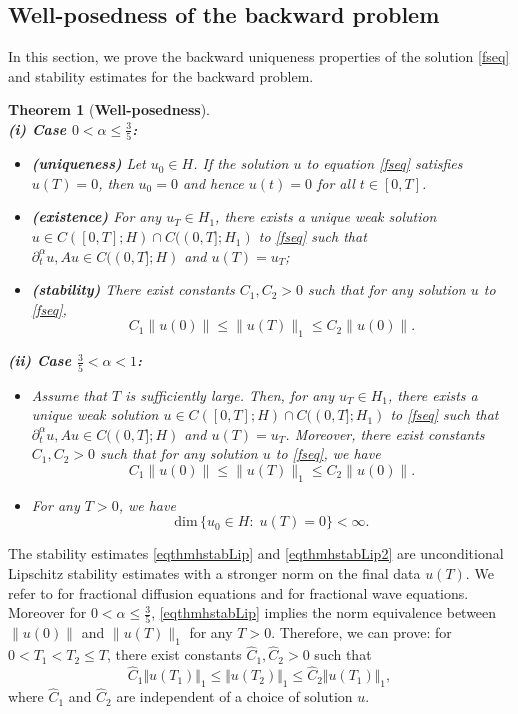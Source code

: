 \documentclass[reqno]{amsart}
\newtheorem{theorem}{Theorem}[section]
\numberwithin{equation}{section}
\begin{document}
\subsection{Well-posedness of the backward problem}
In this section, we prove the backward uniqueness properties of the solution \eqref{fseq} and stability estimates for the backward problem.
\begin{theorem}[\textbf{Well-posedness}]\label{bu}\
\\{\bf (i) Case $0<\alpha \le \frac{3}{5}$:}
\begin{itemize}
    \item[\bf (a)] {\bf (uniqueness)}
Let $u_0 \in H$. If the solution $u$ to equation \eqref{fseq} 
satisfies $u(T) = 0$, then $u_0 = 0$ and hence $u(t) = 0$ for all 
$t \in [0, T]$.
\item[\bf (b)] {\bf (existence)} 
For any $u_T \in H_1$, there exists a unique weak solution $u \in C([0, T]; H)\cap 
C((0, T] ; H_1)$ to \eqref{fseq} such that $\partial_t^\alpha u, Au 
\in C((0, T] ; H)$ and $u(T)=u_T$;
\item[\bf (c)] {\bf (stability)}
There exist constants $C_1, C_2 >0$ such that for any solution $u$ to 
\eqref{fseq},
\begin{equation}\label{eqthmhstabLip}
C_1\|u(0)\| \le \|u(T)\|_{1} \le C_2 \|u(0)\|.
\end{equation}
\end{itemize}
{\bf (ii) Case $\frac{3}{5} < \alpha < 1$:}
\begin{itemize}
\item[\bf (a)] Assume that $T$ is sufficiently large. 
Then, for any $u_T \in H_1$, there exists a unique weak solution $u \in C([0, T] ; H)
\cap C((0, T]; H_1)$ to \eqref{fseq} such that $\partial_t^\alpha u, Au 
\in C((0, T] ; H)$ and $u(T)=u_T$.
Moreover, there exist constants $C_1, C_2 >0$ such that for any solution 
$u$ to \eqref{fseq}, we have
\begin{equation}\label{eqthmhstabLip2}
C_1\|u(0)\| \le \|u(T)\|_{1} \le C_2 \|u(0)\|.
\end{equation}
\item[\bf (b)] For any $T>0$, we have
$$
\mathrm{dim}\, \{u_0 \in H: \; u(T) =  0\} < \infty.
$$
\end{itemize}
\end{theorem}

The stability estimates \eqref{eqthmhstabLip} and \eqref{eqthmhstabLip2} are unconditional Lipschitz stability estimates with a stronger norm on the final data $u(T)$. We refer to \cite[Theorem 4.1]{SY11} for fractional diffusion equations and 
\cite[Theorem 1.3]{FY20} for fractional wave equations. Moreover for $0 < \alpha \le \frac{3}{5}$, \eqref{eqthmhstabLip} implies the norm equivalence between $\|u(0)\|$ and $\|u(T)\|_{1}$ for any $T>0$. Therefore, we can prove: for $0< T_1 <T_2\leq T$, there exist constants $\widehat{C}_1, \widehat{C}_2 > 0$ such that
$$
\widehat{C}_1 \Vert u(T_1)\Vert_1 \le \Vert u(T_2)\Vert_1 \le \widehat{C}_2 \Vert u(T_1)\Vert_1,
$$
where $\widehat{C}_1$ and $\widehat{C}_2$ are independent of a choice  of solution $u$.
\end{document}
